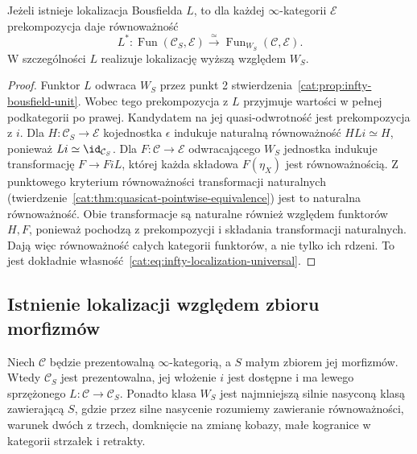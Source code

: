\begin{stwierdzenie}\label{cat:prop:infty-bousfield-universal}
Jeżeli istnieje lokalizacja Bousfielda $L$, to dla każdej $\infty$-kategorii $\mathcal E$ prekompozycja daje równoważność
\[
 L^*:\operatorname{Fun}(\mathcal C_S,\mathcal E)
 \xrightarrow{\simeq}\operatorname{Fun}_{W_S}(\mathcal C,\mathcal E).
\]
W szczególności $L$ realizuje lokalizację wyższą względem $W_S$.
\end{stwierdzenie}
\begin{proof}
Funktor $L$ odwraca $W_S$ przez punkt 2 stwierdzenia~\ref{cat:prop:infty-bousfield-unit}. Wobec tego prekompozycja z $L$ przyjmuje wartości w pełnej podkategorii po prawej. Kandydatem na jej quasi-odwrotność jest prekompozycja z $i$. Dla $H:\mathcal C_S\to\mathcal E$ kojednostka $\epsilon$ indukuje naturalną równoważność $HLi\simeq H$, ponieważ $Li\simeq\id_{\mathcal C_S}$. Dla $F:\mathcal C\to\mathcal E$ odwracającego $W_S$ jednostka indukuje transformację $F\to FiL$, której każda składowa $F(\eta_X)$ jest równoważnością. Z punktowego kryterium równoważności transformacji naturalnych (twierdzenie~\ref{cat:thm:quasicat-pointwise-equivalence}) jest to naturalna równoważność. Obie transformacje są naturalne również względem funktorów $H,F$, ponieważ pochodzą z prekompozycji i składania transformacji naturalnych. Dają więc równoważność całych kategorii funktorów, a nie tylko ich rdzeni. To jest dokładnie własność~\eqref{cat:eq:infty-localization-universal}.
\end{proof}

\subsection{Istnienie lokalizacji względem zbioru morfizmów}

\begin{twierdzenie}\label{cat:thm:infty-bousfield-existence}
Niech $\mathcal C$ będzie prezentowalną $\infty$-kategorią, a $S$ małym zbiorem jej morfizmów. Wtedy $\mathcal C_S$ jest prezentowalna, jej włożenie $i$ jest dostępne i ma lewego sprzężonego $L:\mathcal C\to\mathcal C_S$. Ponadto klasa $W_S$ jest najmniejszą silnie nasyconą klasą zawierającą $S$, gdzie przez silne nasycenie rozumiemy zawieranie równoważności, warunek dwóch z trzech, domknięcie na zmianę kobazy, małe kogranice w kategorii strzałek i retrakty.
\end{twierdzenie}

